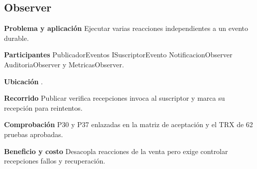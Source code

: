 \noindent\begin{minipage}{\linewidth}
\subsection{Observer}
\textbf{Problema y aplicación} Ejecutar varias reacciones independientes a un evento durable.

\textbf{Participantes} PublicadorEventos ISuscriptorEvento NotificacionObserver AuditoriaObserver y MetricasObserver.

\textbf{Ubicación} \href{https://github.com/Alan77-bot/LogiMarket360Alan/blob/68bda51063441415524ede51bdf61649ee9b4973/LogiMarket.Application/Eventos/PublicadorEventos.cs#L10}{}.

\textbf{Recorrido} Publicar verifica recepciones invoca al suscriptor y marca su recepción para reintentos.


\textbf{Comprobación} P30 y P37 enlazadas en la matriz de aceptación y el TRX de 62 pruebas aprobadas.

\textbf{Beneficio y costo} Desacopla reacciones de la venta pero exige controlar recepciones fallos y recuperación.

\end{minipage}\par\smallskip
